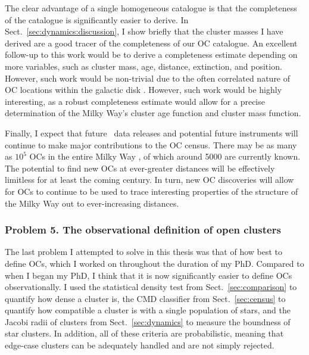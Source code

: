 The clear advantage of a single homogeneous catalogue is that the completeness of the catalogue is significantly easier to derive. In Sect.~\ref{sec:dynamics:discussion}, I show briefly that the cluster masses I have derived are a good tracer of the completeness of our OC catalogue. An excellent follow-up to this work would be to derive a completeness estimate depending on more variables, such as cluster mass, age, distance, extinction, and position. However, such work would be non-trivial due to the often correlated nature of OC locations within the galactic disk \citep{anders_milky_2020}. However, such work would be highly interesting, as a robust completeness estimate would allow for a precise determination of the Milky Way's cluster age function and cluster mass function.

Finally, I expect that future \gaia\ data releases and potential future instruments will continue to make major contributions to the OC census. There may be as many as $10^5$ OCs in the entire Milky Way \citep{dias_new_2002}, of which around 5000 are currently known. The potential to find new OCs at ever-greater distances will be effectively limitless for at least the coming century. In turn, new OC discoveries will allow for OCs to continue to be used to trace interesting properties of the structure of the Milky Way out to ever-increasing distances. 


\subsubsection{Problem 5. The observational definition of open clusters}

The last problem I attempted to solve in this thesis was that of how best to define OCs, which I worked on throughout the duration of my PhD. Compared to when I began my PhD, I think that it is now significantly easier to define OCs observationally. I used the statistical density test from Sect.~\ref{sec:comparison} to quantify how dense a cluster is, the CMD classifier from Sect.~\ref{sec:census} to quantify how compatible a cluster is with a single population of stars, and the Jacobi radii of clusters from Sect.~\ref{sec:dynamics} to measure the boundness of star clusters. In addition, all of these criteria are probabilistic, meaning that edge-case clusters can be adequately handled and are not simply rejected.

